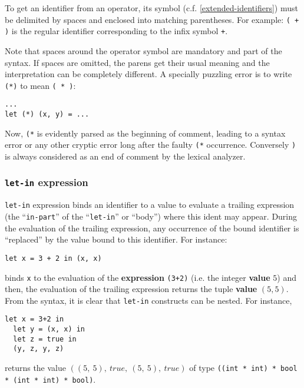 To get an identifier from an operator, its symbol
(c.f. \ref{extended-identifiers}) must be delimited by spaces and enclosed
into matching parentheses.
For example: {\tt (\ + )} is the regular identifier corresponding to the
infix symbol {\tt +}.

Note that spaces around the operator symbol are mandatory and part of the
syntax. If spaces are omitted, the parens get their usual meaning and the
interpretation can be completely different.
A specially puzzling error is to write {\tt (*)} to mean {\tt ( * )}:
{\scriptsize
\begin{lstlisting}
...
let (*) (x, y) = ...
\end{lstlisting}
}
Now, {\tt (*} is evidently parsed as the beginning of comment,
leading to a syntax error or any other cryptic error long after the faulty
{\tt (*} occurrence.
Conversely {\tt *)} is always considered as an end of comment by the lexical
analyzer.




\subsubsection{{\tt let-in} expression}
{\tt let-in} expression binds an identifier to a value to
evaluate a trailing expression (the ``{\tt in-part}'' of the ``{\tt let-in}''
or ``body'') where this ident may appear. During the evaluation of the
trailing expression, any occurrence of the bound identifier is ``replaced''
by the value bound to this identifier. For instance:
{\scriptsize
\begin{lstlisting}
let x = 3 + 2 in (x, x)
\end{lstlisting}
}
 binds {\tt x} to the evaluation of the {\bf expression} {\tt (3+2)}
(i.e. the integer {\bf value} $5$) and then, the evaluation of the
trailing expression returns the tuple {\bf value} $(5, 5)$.  From the
syntax, it is clear that {\tt let-in} constructs can be nested.  For
instance, {\scriptsize
\begin{lstlisting}
let x = 3+2 in
  let y = (x, x) in
  let z = true in
  (y, z, y, z)
\end{lstlisting}
}
returns the value $((5,\ 5),\ true,\ (5,\ 5),\ true)$ of type
{\tt ((int * int) * bool * (int * int) * bool)}.



